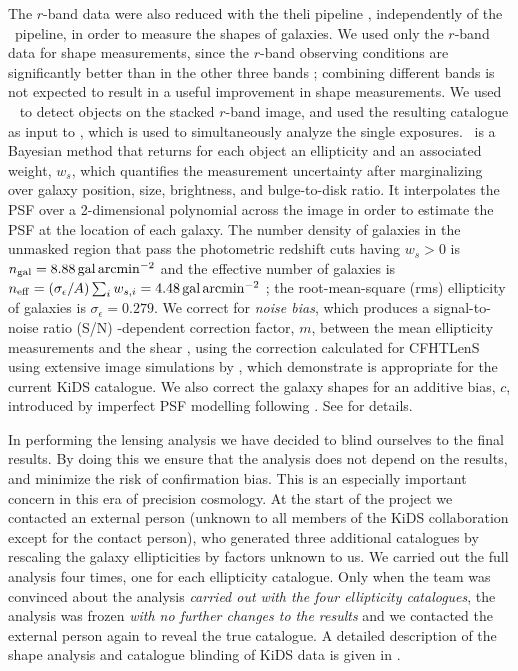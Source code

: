 The $r$-band data were also reduced with the {\sc theli} pipeline \citep{erben13}, independently of 
the \awise\ pipeline, in order to measure the shapes of galaxies. We used only the $r$-band data 
for shape measurements, since the $r$-band observing conditions are significantly better than in 
the other three bands \citep[see][]{dejong13}; combining different bands is not expected to result 
in a useful improvement in shape measurements. We used \sex\ \citep{bertin96} to detect objects on 
the stacked $r$-band image, and used the resulting catalogue as input to \lensfit, which is used to 
simultaneously analyze the single exposures. \Lensfit\ is a Bayesian method that returns for each 
object an ellipticity and an associated weight, $w_s$, which quantifies the measurement uncertainty 
after marginalizing over galaxy position, size, brightness, and bulge-to-disk ratio. It interpolates 
the PSF over a 2-dimensional polynomial across the image in order to estimate the PSF at the 
location of each galaxy. The number density of galaxies in the unmasked region that pass the 
photometric redshift cuts having $w_s>0$ is $n_{\rm gal}=8.88\,\mathrm{gal\,arcmin^{-2}}$ and the 
effective number of galaxies is $n_{\rm 
eff}=(\sigma_\epsilon/A)\sum_iw_{s,i}=4.48\,\mathrm{gal\,arcmin^{-2}}$ 
\citep[see][]{chang13_neff,kuijken15}; the root-mean-square (rms) ellipticity of galaxies is  
$\sigma_\epsilon=0.279$. We correct for \emph{noise bias}, which produces a signal-to-noise ratio 
(S/N) -dependent correction factor, $m$, between the mean ellipticity measurements and the shear 
\citep[e.g.,][see ]{melchior12,refregier12,viola14}, using the correction calculated 
for CFHTLenS using extensive image simulations by \cite{miller13}, which \cite{kuijken15} 
demonstrate is appropriate for the current KiDS catalogue. We also correct the galaxy shapes for an 
additive bias, $c$, introduced by imperfect PSF modelling following \cite{heymans12}. 
See \cite{kuijken15} for details.

In performing the lensing analysis we have decided to blind ourselves to the final results. By 
doing this we ensure that the analysis does not depend on the results, and minimize the risk of 
confirmation bias. This is an especially important concern in this era of precision cosmology. At 
the start of the project we contacted an external person (unknown to all members of the KiDS 
collaboration except for the contact person), who generated three additional catalogues by 
rescaling the galaxy ellipticities by factors unknown to us. We carried out the full analysis four 
times, one for each ellipticity catalogue. Only when the team was convinced about the analysis 
\emph{carried out with the four ellipticity catalogues}, the analysis was frozen \emph{with no 
further changes to the results} and we contacted the external person again to reveal the true 
catalogue. A detailed description of the shape analysis and catalogue blinding of KiDS data is 
given in \cite{kuijken15}.


